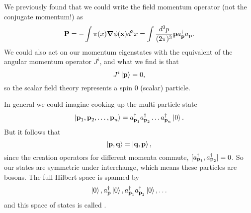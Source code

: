 We previously found that we could write the field momentum operator (not the conjugate momentum!) as
$$\boldsymbol{\mathbf{P}}=-\int \pi(x) \mbox{\boldmath$ \nabla $} \phi(\boldsymbol{\mathbf{x}}) d^3x = \int \frac{d^3p}{(2\pi)^3} \boldsymbol{\mathbf{ p}} a_{\boldsymbol{\mathbf{p}}}^\dagger a_{\boldsymbol{\mathbf{p}}}.$$
We could also act on our momentum eigenstates with the equivalent of the angular momentum operator $J^i$, and what we find is that 
$$J^i\left| \boldsymbol{\mathbf{p}} \right>=0,$$
so the scalar field theory represents a spin $0$ (scalar) particle.

In general we could imagine cooking up the multi-particle state
$$\left| \boldsymbol{\mathbf{p}}_1,\boldsymbol{\mathbf{p}}_2,\ldots,\boldsymbol{\mathbf{p}}_n \right>=a_{\boldsymbol{\mathbf{p}}_1}^\dagger a_{\boldsymbol{\mathbf{p}}_2}^\dagger \ldots a_{\boldsymbol{\mathbf{p}}_n}^\dagger \left| 0 \right>.$$
But it follows that
$$\left| \boldsymbol{\mathbf{p}}, \boldsymbol{\mathbf{q}} \right>=\left| \boldsymbol{\mathbf{q}},\boldsymbol{\mathbf{p}} \right>,$$
since the creation operators for different momenta commute, $[a_{\boldsymbol{\mathbf{p}}_1}^\dagger, a_{\boldsymbol{\mathbf{p}}_2}^\dagger]=0$. So our states are symmetric under interchange, which means these particles are bosons. The full Hilbert space is spanned by
$$\left| 0 \right>,a_{\boldsymbol{\mathbf{p}}}^\dagger \left| 0 \right>, a_{\boldsymbol{\mathbf{p}}_1}^\dagger a_{\boldsymbol{\mathbf{p}}_2}^\dagger\left| 0 \right>, \ldots$$
and this space of states is called .

